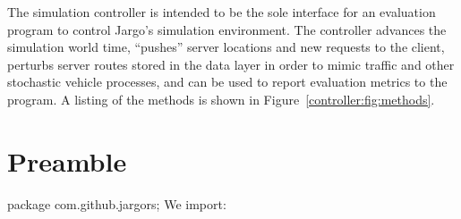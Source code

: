 The simulation controller is intended to be the sole interface for an
evaluation program to control Jargo's simulation environment. The controller
advances the simulation world time, ``pushes'' server locations and new
requests to the client, perturbs server routes stored in the data layer in
order to mimic traffic and other stochastic vehicle processes, and can be used
to report evaluation metrics to the program.  A listing of the methods is shown
in Figure~\ref{controller:fig:methods}.

\section{Preamble}
\nwenddocs{}\endmoddef{}
package com.github.jargors;
\nwendcode{}\nwdocspar
We import:
